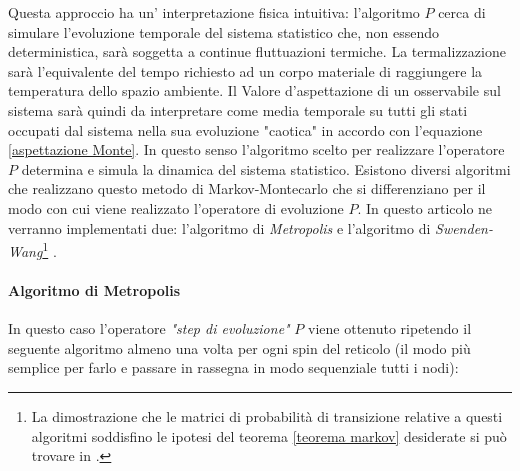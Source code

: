 Questa approccio ha un' interpretazione fisica intuitiva: l'algoritmo $P$ cerca di simulare l'evoluzione temporale del sistema statistico che, non essendo deterministica, sarà soggetta a continue fluttuazioni termiche.
La termalizzazione sarà l'equivalente del tempo richiesto ad un corpo materiale di raggiungere la temperatura dello spazio ambiente. 
Il Valore d'aspettazione di un osservabile sul sistema sarà quindi da interpretare come media temporale su tutti gli stati occupati dal sistema nella sua evoluzione "caotica" in accordo con l'equazione \ref{aspettazione Monte}. In questo senso l'algoritmo scelto per realizzare l'operatore $P$ determina e simula la dinamica del sistema statistico.
\medskip\newline
Esistono diversi algoritmi che realizzano questo metodo di Markov-Montecarlo che si differenziano per il modo con cui viene realizzato l'operatore di evoluzione $P$. In questo articolo ne verranno implementati due: l'algoritmo di \emph{Metropolis} e l'algoritmo di \emph{Swenden-Wang}\footnote{ La dimostrazione che le matrici di probabilità di transizione relative a questi algoritmi soddisfino le ipotesi del teorema \ref{teorema markov} desiderate si può trovare in \cite{Newman2001}.} .

\paragraph{Algoritmo di Metropolis}
In questo caso l'operatore \emph{"step di evoluzione"} $P$ viene ottenuto ripetendo il seguente algoritmo almeno una volta per ogni spin del reticolo (il modo più semplice per farlo e passare in rassegna in modo sequenziale tutti i nodi):
\bigskip

